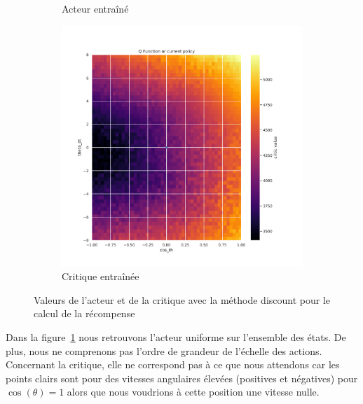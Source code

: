 \begin{figure}[H]
\begin{subfigure}{0.3\textwidth}
        \caption{Acteur entraîné}
    \end{subfigure}
    \begin{subfigure}{0.3\textwidth}
        \includegraphics[width=\textwidth]{figures/iteration2/0_critic_discount_post_Pendulum-v0.pdf}
        \caption{Critique entraînée}
    \end{subfigure}
    \caption{Valeurs de l'acteur et de la critique avec la méthode discount pour le calcul de la récompense}
    \label{fig:itr2_discount}
\end{figure}

Dans la figure~\ref{fig:itr2_discount} nous retrouvons l'acteur uniforme sur l'ensemble des états. De plus, nous ne comprenons pas l'ordre de grandeur de l'échelle des actions. Concernant la critique, elle ne correspond pas à ce que nous attendons car les points clairs sont pour des vitesses angulaires élevées (positives et négatives) pour $\cos(\theta) = 1$ alors que nous voudrions à cette position une vitesse nulle. 

